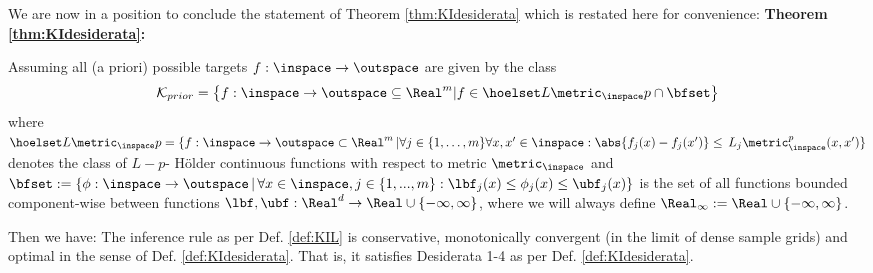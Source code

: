 
We are now in a position to conclude the statement of Theorem \ref{thm:KIdesiderata} which is restated here for convenience:
\textbf{Theorem \ref{thm:KIdesiderata}:}

Assuming all (a priori) possible targets $f: \inspace \to \outspace$ are given by the class   
\begin{equation}
	\mathcal K_{prior}= \bigl\{ f : \inspace \to \outspace \subseteq \Real^m |  f \in \hoelset L {\metric_{\inspace}} p \cap \bfset \bigr\}
\end{equation}
where $\hoelset L {\metric_\inspace} p =\{ f: \inspace \to \outspace \subset \Real^m \, |  \forall j \in \{1,\ldots,m\} \forall x,x' \in \inspace: \abs{f_j(x) - f_j(x')}  \leq \, L_j \metric^p_{\inspace}(x,x') \}$ denotes the class of $L-p$- H\"older continuous functions with respect to metric $\metric_\inspace$ and $\bfset :=\{\phi : \inspace \to \outspace \, | \, \forall x \in \inspace, j \in\{1,...,m\}: \lbf_j(x) \leq \phi_j(x) \leq \ubf_j(x)\} $
is the set of all functions bounded component-wise between functions $\lbf,\ubf: \Real^d \to \Real \cup \{- \infty, \infty\}$, where we will always define $\Real_\infty := \Real \cup\{- \infty, \infty\}$. 

Then we have:
The inference rule as per Def. \ref{def:KIL} is conservative, monotonically convergent (in the limit of dense sample grids) and optimal in the sense of Def. \ref{def:KIdesiderata}. That is, it satisfies Desiderata 1-4 as per Def. \ref{def:KIdesiderata}. 

